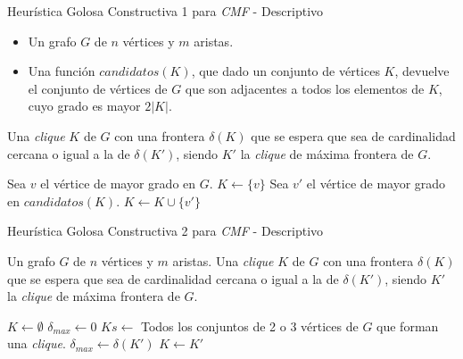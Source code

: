 \begin{algorithm}[H]
    \caption{Heur\'istica Golosa Constructiva 1 para \emph{CMF} - Descriptivo}
    \begin{algorithmic}[1]
        \Require\Statex
            \begin{itemize}
                \item Un grafo $G$ de $n$ v\'ertices y $m$ aristas.

                \item Una funci\'on $candidatos(K)$, que dado un conjunto de v\'ertices
                    $K$, devuelve el conjunto de v\'ertices de $G$ que son adjacentes
                    a todos los elementos de $K$, cuyo grado es mayor $2|K|$.
            \end{itemize}

        \Statex

        \Ensure Una \emph{clique} $K$ de $G$ con una frontera $\delta(K)$ que se
            espera que sea de cardinalidad cercana o igual a la de $\delta(K')$,
            siendo $K'$ la \emph{clique} de m\'axima frontera de $G$.

        \Statex

        \State Sea $v$ el v\'ertice de mayor grado en $G$.
        \State $K \gets \{v\}$
            \State Sea $v'$ el v\'ertice de mayor grado en $candidatos(K)$.
            \State $K \gets K \cup \{v'\}$
        \EndWhile

        \State {}
    \end{algorithmic}
\end{algorithm}

\begin{algorithm}[H]
    \caption{Heur\'istica Golosa Constructiva 2 para \emph{CMF} - Descriptivo}
    \begin{algorithmic}[1]
        \Require Un grafo $G$ de $n$ v\'ertices y $m$ aristas.
        \Ensure Una \emph{clique} $K$ de $G$ con una frontera $\delta(K)$ que se
            espera que sea de cardinalidad cercana o igual a la de $\delta(K')$,
            siendo $K'$ la \emph{clique} de m\'axima frontera de $G$.

        \Statex

        \State $K \gets \emptyset$
        \State $\delta_{max} \gets 0$
        \State $Ks \gets $ Todos los conjuntos de 2 o 3 v\'ertices de $G$ que
            forman una \emph{clique}.
                \State $\delta_{max} \gets \delta(K')$
                \State $K \gets K'$

            \EndIf

        \EndForEach

        \State {}
    \end{algorithmic}
\end{algorithm}
